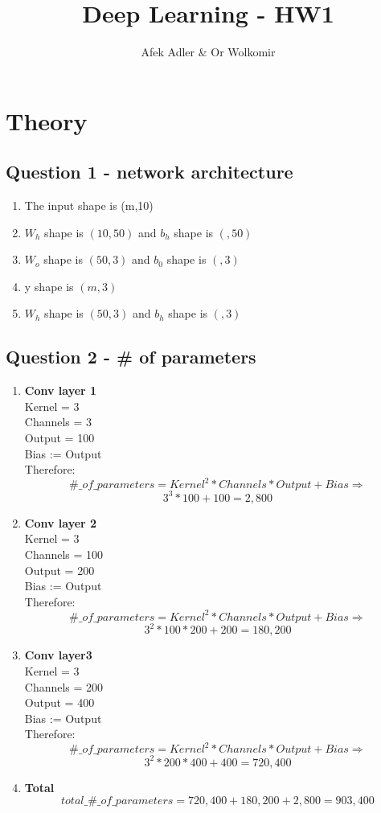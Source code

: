 \documentclass[10pt]{article}
\title {Deep Learning - HW1}
\author{Afek Adler \& Or Wolkomir}
\begin{document}
\maketitle
\section{Theory}
\subsection{Question 1 - network architecture}
\begin{enumerate}[label=(\alph*)]

\item The input shape is (m,10)
\item $W_h$ shape is $(10,50)$ and $b_h$ shape is $(,50)$
\item $W_o$  shape is $(50,3)$ and $b_0$ shape is $(,3)$
\item y  shape is $(m,3)$
\item $W_h$ shape is $(50,3)$ and $b_h$ shape is $(,3)$
\end{enumerate}

\subsection{Question 2 - \# of parameters}
\begin{enumerate}[label=(\alph*)]

\item \textbf{Conv layer 1} \\
Kernel =  3 \\
Channels = 3 \\
Output = 100 \\
Bias := Output\\
Therefore:\\
\[\#\_of\_parameters = Kernel^{2}*Channels*Output + Bias \Rightarrow \] 
\[3^{3}*100 + 100 = 2,800\] 

\item \textbf{Conv layer 2} \\
Kernel =  3 \\
Channels = 100 \\
Output = 200 \\
Bias := Output\\
Therefore:\\
\[\#\_of\_parameters = Kernel^{2}*Channels*Output + Bias \Rightarrow \] 
\[3^{2}*100*200 +200 = 180,200\] 

\item \textbf{Conv layer3} \\
Kernel =  3 \\
Channels = 200 \\
Output = 400 \\
Bias := Output\\
Therefore:\\
\[\#\_of\_parameters = Kernel^{2}*Channels*Output + Bias \Rightarrow \] 
\[3^{2}*200*400 +400 = 720,400\] 

\item \textbf{Total} \\
\[total\_\#\_of\_parameters = 720,400 + 180,200 +  2,800 = 903,400 \] 
\end{enumerate}
\end{document}
